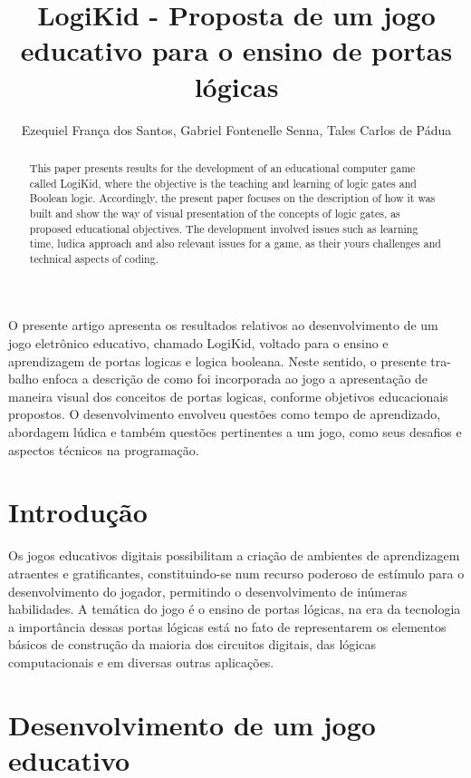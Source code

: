 \documentclass[12pt]{article}
\title{LogiKid - Proposta de um jogo educativo para o ensino de portas lógicas}
\author{Ezequiel França dos Santos\inst{1}, Gabriel Fontenelle Senna\inst{1}, Tales Carlos de Pádua\inst{1} }
\begin{document}
 
\maketitle
\begin{abstract}
This paper presents results for the development of an educational computer game called LogiKid,  where the objective is the teaching and learning of logic gates and Boolean logic. Accordingly, the present paper focuses on the description of how it was built and show the way of visual presentation of the concepts of logic gates, as proposed educational objectives. The development involved issues such as learning time, ludica approach and also relevant issues for a game, as their yours challenges and technical aspects of coding.
\end{abstract}
     
\begin{resumo} 
O presente artigo apresenta os resultados relativos ao desenvolvimento de um jogo eletrônico educativo, chamado
LogiKid, voltado para o ensino e aprendizagem de portas logicas e logica booleana. Neste sentido, o presente tra-
balho enfoca a descrição de como foi incorporada ao jogo a apresentação de maneira visual dos conceitos de portas logicas, conforme objetivos educacionais propostos. O
desenvolvimento envolveu questões como tempo de aprendizado, abordagem lúdica e também questões pertinentes
a um jogo, como seus desafios e aspectos técnicos na programação.
\end{resumo}


\section{Introdução}
Os jogos educativos digitais possibilitam a criação de ambientes de
aprendizagem atraentes e gratificantes, constituindo-se num recurso poderoso de
estímulo para o desenvolvimento do jogador, permitindo o desenvolvimento de
inúmeras habilidades. A temática do jogo é o ensino de portas lógicas, na era da tecnologia a importância dessas portas lógicas está no fato de representarem os elementos básicos de construção da maioria dos circuitos digitais, das lógicas computacionais e em diversas outras aplicações.

\section*{Desenvolvimento de um jogo educativo} \label{sec:gamedev}
\end{document}
